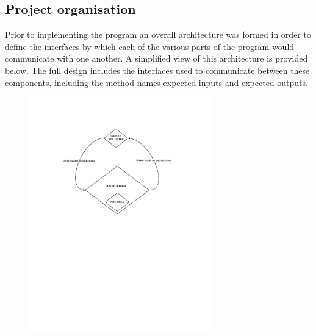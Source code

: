 \documentclass[bibliography=totocnumbered, 10pt]{article}
\theoremstyle{NoticeStyle}
\begin{document}
\subsection{Project organisation}
Prior to implementing the program an overall architecture was formed in order to define the interfaces by which each of the various parts of the program would communicate with one another. A simplified view of this architecture is provided below. The full design includes the interfaces used to communicate between these components, including the method names expected inputs and expected outputs.
\begin{figure}[H]
\centering
\includegraphics[width=0.7\textwidth]{img/QCPOverallArch.pdf}
\caption{}
\end{figure}
\end{document}
